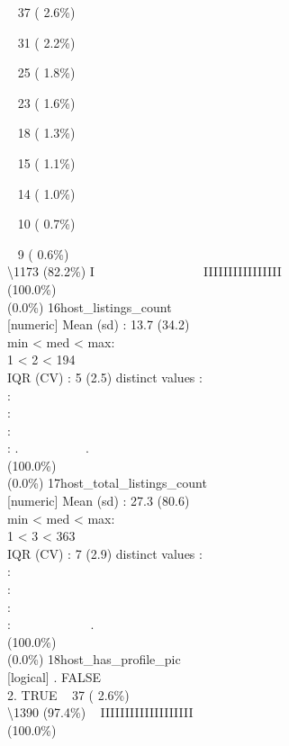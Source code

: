 \documentclass[
  journal,
]{IEEEtran}%
\begin{document}
\strut ~ 37 ( 2.6\%)\\
\strut ~ 31 ( 2.2\%)\\
\strut ~ 25 ( 1.8\%)\\
\strut ~ 23 ( 1.6\%)\\
\strut ~ 18 ( 1.3\%)\\
\strut ~ 15 ( 1.1\%)\\
\strut ~ 14 ( 1.0\%)\\
\strut ~ 10 ( 0.7\%)\\
\strut ~ 9 ( 0.6\%)\\
\textbackslash1173 (82.2\%) \textbar{} \textbar I ~ ~ ~ ~ ~ ~ ~ ~ ~ ~
IIIIIIIIIIIIIIII \\
(100.0\%) \\
(0.0\%) \textbar{} \textbar{} 16\textbar host\_listings\_count\\
{[}numeric{]} \textbar Mean (sd) : 13.7 (34.2)\\
min \textless{} med \textless{} max:\\
1 \textless{} 2 \textless{} 194\\
IQR (CV) : 5 (2.5)  distinct values \textbar{} \textbar:\\
:\\
:\\
:\\
: . ~~~~~~~~~~. \\
(100.0\%) \\
(0.0\%) \textbar{} \textbar{} 17\textbar host\_total\_listings\_count\\
{[}numeric{]} \textbar Mean (sd) : 27.3 (80.6)\\
min \textless{} med \textless{} max:\\
1 \textless{} 3 \textless{} 363\\
IQR (CV) : 7 (2.9)  distinct values \textbar{} \textbar:\\
:\\
:\\
:\\
: ~~~~~~~~~~~~. \\
(100.0\%) \\
(0.0\%) \textbar{} \textbar{} 18\textbar host\_has\_profile\_pic\\
{[}logical{]} . FALSE\\
2. TRUE \textbar~ 37 ( 2.6\%)\\
\textbackslash1390 (97.4\%) \textbar{} \textbar~ IIIIIIIIIIIIIIIIIII
\\
(100.0\%) \\
\end{document}
